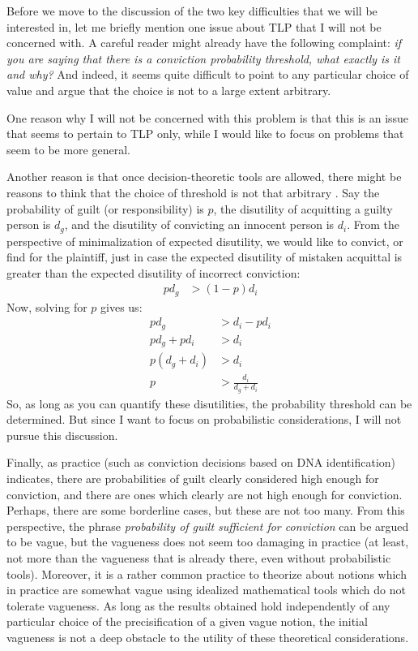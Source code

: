 \documentclass{ifcolog}
\begin{document}
Before we move to the discussion of the two key difficulties that we will be interested in, let me briefly mention one issue about TLP that I will not  be concerned with. A careful reader might already have the following complaint: \emph{if you are saying that there is a conviction probability threshold, what exactly is it and why?} And indeed, it seems quite difficult to point to any particular choice of value and argue that the choice is not  to a large extent arbitrary. 

One reason why I will not be concerned with this problem is that this is an issue that seems to pertain to TLP only, while I would like to focus on problems that seem to be more general.

Another reason is that once decision-theoretic tools are allowed, there might be reasons to think that the choice of threshold is not that arbitrary \citep{kaye1986we}. Say  the probability of guilt (or responsibility) is $p$, the disutility of acquitting a guilty person is $d_g$, and the disutility of convicting an innocent person is $d_i$. From the perspective of minimalization of expected disutility, we would like to convict, or find for the plaintiff, just in case the expected disutility of mistaken acquittal is greater than the expected disutility of incorrect conviction:
\begin{align*}
p d_g &> (1-p)  d_i
\end{align*}
\noindent Now, solving for $p$ gives us:
\begin{align*}
p d_g &> d_i - p d_i\\
p d_g + pd_i & > d_i \\
p(d_g+d_i)&>d_i\\
p & > \frac{d_i}{d_g+d_i}
\end{align*}
\noindent So, as long as you can quantify these disutilities,  the probability threshold can be determined. But since I want to focus on probabilistic considerations, I will not pursue this discussion.

Finally, as practice (such as conviction decisions based on DNA identification) indicates, there are probabilities of guilt clearly considered high enough for conviction, and there are ones which clearly are not high enough for conviction. Perhaps, there are some borderline cases, but these are not too many. From this perspective, the phrase \emph{probability of guilt sufficient for conviction} can be argued to be vague, but the vagueness does not  seem too damaging in practice (at least, not more than the vagueness that is already there, even without probabilistic tools). Moreover, it is a rather common practice to theorize about notions which in practice are somewhat vague using idealized mathematical tools which do not tolerate vagueness. As long as the results obtained hold independently of any particular choice of the precisification of a given vague notion, the initial vagueness is not a deep obstacle to the utility of these theoretical considerations. 
\end{document}
